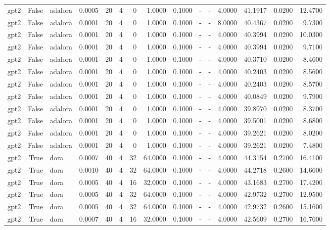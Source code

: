\begin{tabular}{lrlrrrrrrlllrrr}
gpt2 & False & adalora & 0.0005 & 20 & 4 & 0 & 1.0000 & 0.1000 & - & - & 4.0000 & 41.1917 & 0.0200 & 12.4700 \\
gpt2 & False & adalora & 0.0001 & 20 & 4 & 0 & 1.0000 & 0.1000 & - & - & 8.0000 & 40.4367 & 0.0200 & 9.7300 \\
gpt2 & False & adalora & 0.0001 & 20 & 4 & 0 & 1.0000 & 0.1000 & - & - & 4.0000 & 40.3994 & 0.0200 & 10.0300 \\
gpt2 & False & adalora & 0.0001 & 20 & 4 & 0 & 1.0000 & 0.1000 & - & - & 4.0000 & 40.3994 & 0.0200 & 9.7100 \\
gpt2 & False & adalora & 0.0001 & 20 & 4 & 0 & 1.0000 & 0.1000 & - & - & 4.0000 & 40.3710 & 0.0200 & 8.4600 \\
gpt2 & False & adalora & 0.0001 & 20 & 4 & 0 & 1.0000 & 0.1000 & - & - & 4.0000 & 40.2403 & 0.0200 & 8.5600 \\
gpt2 & False & adalora & 0.0001 & 20 & 4 & 0 & 1.0000 & 0.1000 & - & - & 4.0000 & 40.2403 & 0.0200 & 8.5700 \\
gpt2 & False & adalora & 0.0001 & 20 & 4 & 0 & 1.0000 & 0.1000 & - & - & 4.0000 & 40.0849 & 0.0200 & 9.7900 \\
gpt2 & False & adalora & 0.0001 & 20 & 4 & 0 & 1.0000 & 0.1000 & - & - & 4.0000 & 39.8970 & 0.0200 & 8.3700 \\
gpt2 & False & adalora & 0.0001 & 20 & 4 & 0 & 1.0000 & 0.1000 & - & - & 4.0000 & 39.5001 & 0.0200 & 8.6800 \\
gpt2 & False & adalora & 0.0001 & 20 & 4 & 0 & 1.0000 & 0.1000 & - & - & 4.0000 & 39.2621 & 0.0200 & 8.0200 \\
gpt2 & False & adalora & 0.0001 & 20 & 4 & 0 & 1.0000 & 0.1000 & - & - & 4.0000 & 39.2621 & 0.0200 & 7.4800 \\
gpt2 & True & dora & 0.0007 & 40 & 4 & 32 & 64.0000 & 0.1000 & - & - & 4.0000 & 44.3154 & 0.2700 & 16.4100 \\
gpt2 & True & dora & 0.0010 & 40 & 4 & 32 & 64.0000 & 0.1000 & - & - & 4.0000 & 44.2718 & 0.2600 & 14.6600 \\
gpt2 & True & dora & 0.0005 & 40 & 4 & 16 & 32.0000 & 0.1000 & - & - & 4.0000 & 43.1683 & 0.2700 & 17.4200 \\
gpt2 & True & dora & 0.0005 & 40 & 4 & 32 & 64.0000 & 0.1000 & - & - & 4.0000 & 42.9732 & 0.2700 & 12.9500 \\
gpt2 & True & dora & 0.0005 & 40 & 4 & 32 & 64.0000 & 0.1000 & - & - & 4.0000 & 42.9732 & 0.2600 & 15.1600 \\
gpt2 & True & dora & 0.0007 & 40 & 4 & 16 & 32.0000 & 0.1000 & - & - & 4.0000 & 42.5609 & 0.2700 & 16.7600 \\

\end{tabular}
